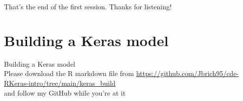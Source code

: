 \documentclass{beamer}
\begin{document}
\begin{frame}
\begin{center}
\Huge That's the end of the first session. Thanks for listening!
\end{center}
\end{frame}
\section{Building a Keras model}
\begin{frame}
\begin{center}
\Huge Building a Keras model\\ 
\small Please download the R markdown file from \url{https://github.com/Jbrich95/cde-RKeras-intro/tree/main/keras_build}\\
\tiny and follow my GitHub while you're at it
\end{center}
\end{frame}
\end{document}
